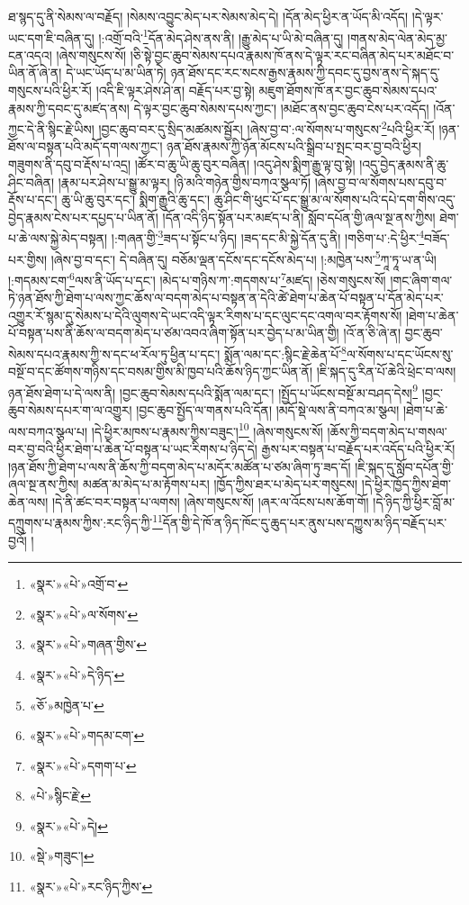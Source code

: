 ཐ་སྙད་དུ་ནི་སེམས་ལ་བརྗོད། །སེམས་འབྱུང་མེད་པར་སེམས་མེད་དེ། །དོན་མེད་ཕྱིར་ན་ཡོད་མི་འདོད། །དེ་ལྟར་ཡང་དག་ཇི་བཞིན་དུ། །:འགྲོ་བའི་\footnote{«སྣར་»«པེ་»འགྲོ་བ་}དོན་མེད་ཤེས་ནས་ནི། །རྒྱུ་མེད་པ་ཡི་མེ་བཞིན་དུ། །གནས་མེད་ལེན་མེད་མྱ་ངན་འདའ། །ཞེས་གསུངས་སོ། །ཅི་སྟེ་བྱང་ཆུབ་སེམས་དཔའ་རྣམས་ཁོ་ནས་དེ་ལྟར་རང་བཞིན་མེད་པར་མཐོང་བ་ཡིན་ནོ་ཞེ་ན། དེ་ཡང་ཡོད་པ་མ་ཡིན་ཏེ། ཉན་ཐོས་དང་རང་སངས་རྒྱས་རྣམས་ཀྱི་དབང་དུ་བྱས་ནས་དེ་སྐད་དུ་གསུངས་པའི་ཕྱིར་རོ། །འདི་ཇི་ལྟར་ཤེས་ཤེ་ན། བརྗོད་པར་བྱ་སྟེ། མཇུག་ཐོགས་ཁོ་ནར་བྱང་ཆུབ་སེམས་དཔའ་རྣམས་ཀྱི་དབང་དུ་མཛད་ནས། དེ་ལྟར་བྱང་ཆུབ་སེམས་དཔས་ཀྱང་། །མཐོང་ནས་བྱང་ཆུབ་ངེས་པར་འདོད། །འོན་ཀྱང་དེ་ནི་སྙིང་རྗེ་ཡིས། །བྱང་ཆུབ་བར་དུ་སྲིད་མཚམས་སྦྱོར། །ཞེས་བྱ་བ་:ལ་སོགས་པ་གསུངས་\footnote{«སྣར་»«པེ་»ལ་སོགས་}པའི་ཕྱིར་རོ། །ཉན་ཐོས་ལ་བསྟན་པའི་མདོ་དག་ལས་ཀྱང་། ཉན་ཐོས་རྣམས་ཀྱི་ཉོན་མོངས་པའི་སྒྲིབ་པ་སྤང་བར་བྱ་བའི་ཕྱིར། གཟུགས་ནི་དབུ་བ་རྡོས་པ་འདྲ། །ཚོར་བ་ཆུ་ཡི་ཆུ་བུར་བཞིན། །འདུ་ཤེས་སྨིག་རྒྱུ་ལྟ་བུ་སྟེ། །འདུ་བྱེད་རྣམས་ནི་ཆུ་ཤིང་བཞིན། །རྣམ་པར་ཤེས་པ་སྒྱུ་མ་ལྟར། །ཉི་མའི་གཉེན་གྱིས་བཀའ་སྩལ་ཏོ། །ཞེས་བྱ་བ་ལ་སོགས་པས་དབུ་བ་རྡོས་པ་དང་། ཆུ་ཡི་ཆུ་བུར་དང་། སྨིག་རྒྱུའི་ཆུ་དང་། ཆུ་ཤིང་གི་ཕུང་པོ་དང་སྒྱུ་མ་ལ་སོགས་པའི་དཔེ་དག་གིས་འདུ་བྱེད་རྣམས་ངེས་པར་དཔྱད་པ་ཡིན་ནོ། །དོན་འདི་ཉིད་སྟོན་པར་མཛད་པ་ནི། སློབ་དཔོན་གྱི་ཞལ་སྔ་ནས་ཀྱིས། ཐེག་པ་ཆེ་ལས་སྐྱེ་མེད་བསྟན། །:གཞན་གྱི་\footnote{«སྣར་»«པེ་»གཞན་གྱིས་}ཟད་པ་སྟོང་པ་ཉིད། །ཟད་དང་མི་སྐྱེ་དོན་དུ་ནི། །གཅིག་པ་:དེ་ཕྱིར་\footnote{«སྣར་»«པེ་»དེ་ཉིད་}བཟོད་པར་གྱིས། །ཞེས་བྱ་བ་དང་། དེ་བཞིན་དུ། བཅོམ་ལྡན་དངོས་དང་དངོས་མེད་པ། །:མཁྱེན་པས་\footnote{«ཅོ་»མཁྱེན་པ་}ཀཱ་ཏཱ་ཡ་ན་ཡི། །:གདམས་ངག་\footnote{«སྣར་»«པེ་»གདམ་ངག་}ལས་ནི་ཡོད་པ་དང་། །མེད་པ་གཉིས་ཀ་:གདགས་པ་\footnote{«སྣར་»«པེ་»དགག་པ་}མཛད། །ཅེས་གསུངས་སོ། །གང་ཞིག་གལ་ཏེ་ཉན་ཐོས་ཀྱི་ཐེག་པ་ལས་ཀྱང་ཆོས་ལ་བདག་མེད་པ་བསྟན་ན་དེའི་ཚེ་ཐེག་པ་ཆེན་པོ་བསྟན་པ་དོན་མེད་པར་འགྱུར་རོ་སྙམ་དུ་སེམས་པ་དེའི་ལུགས་དེ་ཡང་འདི་ལྟར་རིགས་པ་དང་ལུང་དང་འགལ་བར་རྟོགས་སོ། །ཐེག་པ་ཆེན་པོ་བསྟན་པས་ནི་ཆོས་ལ་བདག་མེད་པ་ཙམ་འབའ་ཞིག་སྟོན་པར་བྱེད་པ་མ་ཡིན་གྱི། །འོ་ན་ཅི་ཞེ་ན། བྱང་ཆུབ་སེམས་དཔའ་རྣམས་ཀྱི་ས་དང་ཕ་རོལ་ཏུ་ཕྱིན་པ་དང་། སྨོན་ལམ་དང་:སྙིང་རྗེ་ཆེན་པོ་\footnote{«པེ་»སྙིང་རྗེ་}ལ་སོགས་པ་དང་ཡོངས་སུ་བསྔོ་བ་དང་ཚོགས་གཉིས་དང་བསམ་གྱིས་མི་ཁྱབ་པའི་ཆོས་ཉིད་ཀྱང་ཡིན་ནོ། །ཇི་སྐད་དུ་རིན་པོ་ཆེའི་ཕྲེང་བ་ལས། ཉན་ཐོས་ཐེག་པ་དེ་ལས་ནི། །བྱང་ཆུབ་སེམས་དཔའི་སྨོན་ལམ་དང་། །སྤྱོད་པ་ཡོངས་བསྔོ་མ་བཤད་དེས།\footnote{«སྣར་»«པེ་»དེ།} །བྱང་ཆུབ་སེམས་དཔར་ག་ལ་འགྱུར། །བྱང་ཆུབ་སྤྱོད་ལ་གནས་པའི་དོན། །མདོ་སྡེ་ལས་ནི་བཀའ་མ་སྩལ། །ཐེག་པ་ཆེ་ལས་བཀའ་སྩལ་པ། །དེ་ཕྱིར་མཁས་པ་རྣམས་ཀྱིས་བཟུང་།\footnote{«སྡེ་»གཟུང་།} །ཞེས་གསུངས་སོ། །ཆོས་ཀྱི་བདག་མེད་པ་གསལ་བར་བྱ་བའི་ཕྱིར་ཐེག་པ་ཆེན་པོ་བསྟན་པ་ཡང་རིགས་པ་ཉིད་དེ། རྒྱས་པར་བསྟན་པ་བརྗོད་པར་འདོད་པའི་ཕྱིར་རོ། །ཉན་ཐོས་ཀྱི་ཐེག་པ་ལས་ནི་ཆོས་ཀྱི་བདག་མེད་པ་མདོར་མཚོན་པ་ཙམ་ཞིག་ཏུ་ཟད་དོ། །ཇི་སྐད་དུ་སློབ་དཔོན་གྱི་ཞལ་སྔ་ནས་ཀྱིས། མཚན་མ་མེད་པ་མ་རྟོགས་པར། །ཁྱོད་ཀྱིས་ཐར་པ་མེད་པར་གསུངས། །དེ་ཕྱིར་ཁྱོད་ཀྱིས་ཐེག་ཆེན་ལས། །དེ་ནི་ཚང་བར་བསྟན་པ་ལགས། །ཞེས་གསུངས་སོ། །ཞར་ལ་འོངས་པས་ཆོག་གོ། །དེ་ཉིད་ཀྱི་ཕྱིར་བློ་མ་དཀྲུགས་པ་རྣམས་ཀྱིས་:རང་ཉིད་ཀྱི་\footnote{«སྣར་»«པེ་»རང་ཉིད་ཀྱིས་}དོན་གྱི་དེ་ཁོ་ན་ཉིད་ཁོང་དུ་ཆུད་པར་ནུས་པས་དཀྱུས་མ་ཉིད་བརྗོད་པར་བྱའོ། །
